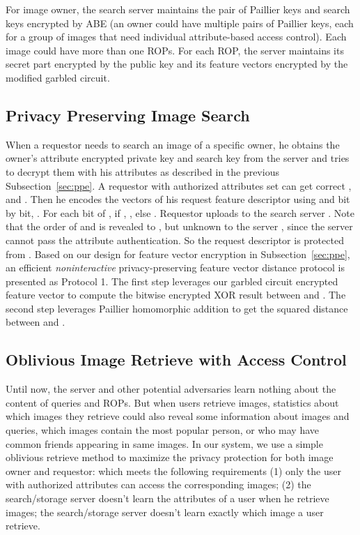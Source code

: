 {For image owner,
 the search server maintains the pair of Paillier keys and search keys
 encrypted by ABE (an owner could have multiple pairs of Paillier
 keys, each for a group of images that need individual attribute-based
 access control).
Each image could have more than one ROPs.
For each ROP, the server maintains its secret part encrypted by the
 public key 
 and its feature vectors encrypted by the modified garbled circuit.




\subsection{Privacy Preserving Image Search}
When a requestor  needs to search an image of a specific owner,
 he obtains the owner's attribute encrypted private key and search key from the server
 and tries to decrypt them with his attributes as described in the previous Subsection~\ref{sec:ppe}.
A requestor with authorized attributes set  can get correct , 
and .
Then he encodes the vectors of his request feature descriptor  using  and  bit by bit,
 \ie .
For each bit  of , if , , else .
Requestor  uploads  to the search server .
Note that the order of  and  is revealed to ,
 but unknown to the server , since the server  cannot pass the attribute authentication.
So the request descriptor  is protected from .
Based on our design for feature vector encryption in Subsection~\ref{sec:ppe},
  an efficient \emph{noninteractive} privacy-preserving feature vector distance protocol is presented as Protocol 1.
The first step leverages our garbled circuit encrypted feature vector to compute
 the bitwise encrypted XOR result between  and .
The second step leverages Paillier homomorphic addition to get the squared distance between  and .





\subsection{Oblivious Image Retrieve with Access Control}

Until now,
 the server and other potential adversaries learn nothing
 about the content of queries and ROPs.
But when users retrieve images,
 statistics about which images they retrieve could also reveal
 some information about images and queries, \eg which images contain
 the most popular person,
 or who may have common friends appearing in same images.
In our system, we use a simple oblivious retrieve method
 to maximize the privacy protection for both image owner and requestor:
 which meets the following requirements
 (1) only the user with authorized attributes can access the corresponding images;
 (2) the search/storage server doesn't learn the attributes of a user when he retrieve images;
the search/storage server doesn't learn exactly which image a user
 retrieve.

}
